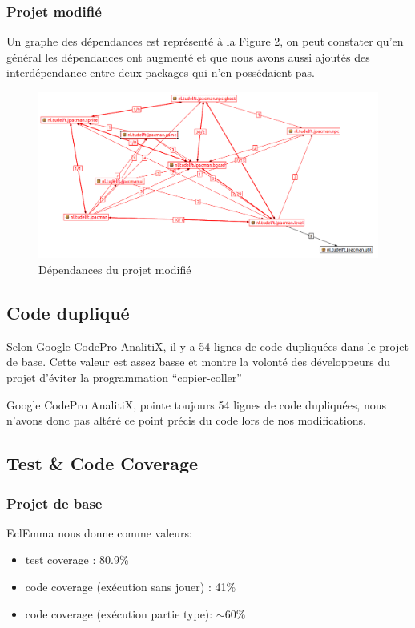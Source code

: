 \documentclass[a4paper,12pt]{report} %
\begin{document}
\subsubsection{Projet modifié}
Un graphe des dépendances est représenté à la Figure 2, on peut constater
qu'en général les dépendances ont augmenté et que nous avons aussi
ajoutés des interdépendance entre deux packages qui n'en possédaient
pas.

\begin{figure}[!h]
\begin{center}\includegraphics[scale=0.5]{ressources/final_new_dependencies}\end{center}\caption{Dépendances du projet modifié}


\end{figure}

\subsection{Code dupliqué}
Selon Google CodePro AnalitiX, il y a 54 lignes de code dupliquées
dans le projet de base. Cette valeur est assez basse et montre la
volonté des développeurs du projet d'éviter la programmation ``copier-coller''

Google CodePro AnalitiX, pointe toujours 54 lignes de code dupliquées,
nous n'avons donc pas altéré ce point précis du code lors de nos modifications.


\subsection{Test \& Code Coverage}
\subsubsection{Projet de base}
EclEmma nous donne comme valeurs:
\begin{itemize}
\item test coverage : 80.9\%
\item code coverage (exécution sans jouer) : 41\%
\item code coverage (exécution partie type): $\sim$60\%
\end{itemize}
\end{document}
